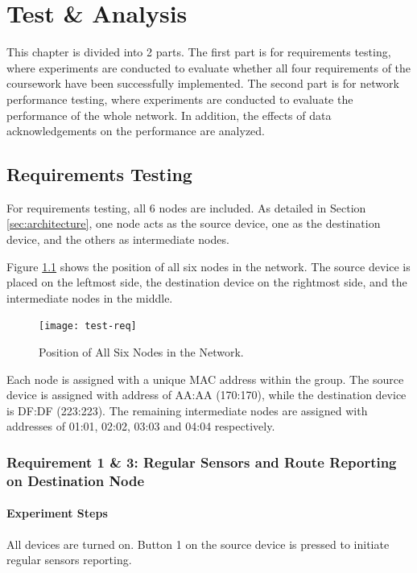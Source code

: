 \chapter{Test \& Analysis}
\label{chap:test}

This chapter is divided into 2 parts. 
The first part is for requirements testing, where experiments are conducted to evaluate whether all four requirements of the coursework have been successfully implemented.
The second part is for network performance testing, where experiments are conducted to evaluate the performance of the whole network.
In addition, the effects of data acknowledgements on the performance are analyzed.

\section{Requirements Testing}

For requirements testing, all 6 nodes are included. 
As detailed in Section \ref{sec:architecture}, one node acts as the source device, one as the destination device, and the others as intermediate nodes.

Figure \ref{fig:test-req} shows the position of all six nodes in the network. 
The source device is placed on the leftmost side, the destination device on the rightmost side, and the intermediate nodes in the middle.

\begin{figure}
\centering
\texttt{[image: test-req]}
\caption{Position of All Six Nodes in the Network.}
\label{fig:test-req}
\end{figure}

Each node is assigned with a unique MAC address within the group. The source device is assigned with address of AA:AA (170:170), while the destination device is DF:DF (223:223).
The remaining intermediate nodes are assigned with addresses of 01:01, 02:02, 03:03 and 04:04 respectively.


\subsection{Requirement 1 \& 3: Regular Sensors and Route Reporting on Destination Node}

\subsubsection{Experiment Steps}

All devices are turned on. Button 1 on the source device is pressed to initiate regular sensors reporting.

